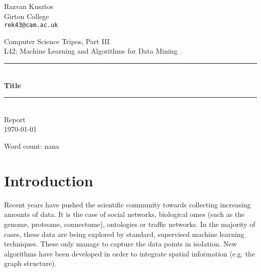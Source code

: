 \documentclass[10pt,a4]{article}
\begin{document}
    
    
    \thispagestyle{empty}
    
    \newcommand{\HRulee}{\rule{\linewidth}{0.5mm}}
    
    \vfil
    
    {\raggedleft \large Razvan Kusztos \\}
    {\raggedleft \large Girton College \\}
    {\raggedleft \large \tt rek43@cam.ac.uk \\}
    
    \vspace{50pt}
    
    \begin{center}
    
        {\Large \sc Computer Science Tripos, Part III \\}
        \vspace{10pt}
        {\Large \sc L42: Machine Learning and Algorithms for Data Mining\\}
        \vspace{20pt}
        \HRulee \\[0.1cm]
        \vspace{10pt}
        {\LARGE \bf Title}
        \HRulee \\[20pt]
        {\LARGE  Report\\}
        \vspace{20pt}
        {\Large \today \\}
        \vspace{40pt}
    \end{center}
    
    \vfill
    
    \begin{flushright}
    Word count: nana
    \end{flushright}
        
    \newpage
    
    \section{Introduction}
    
    Recent years have pushed the scientific community towards collecting increasing 
    amounts of data. It is the case of social networks, biological omes (such as 
    the genome, proteome, connectome), ontologies or traffic networks. 
    In the majority of cases, these data are being explored by standard, 
    supervised machine learning techniques. These only manage to capture the 
    data points in isolation. New algorithms have been developed in order to 
    integrate spatial information (e.g. the graph structure).
    
\end{document}
